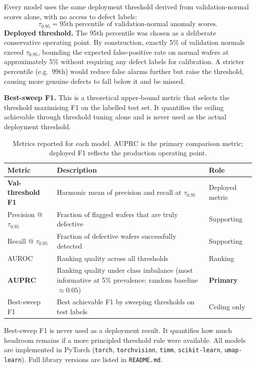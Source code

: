 \documentclass[11pt]{article}
\begin{document}
Every model uses the same deployment threshold derived from validation-normal
scores alone, with no access to defect labels:
\[
  \tau_{0.95} = \text{95th percentile of validation-normal anomaly scores.}
\]
\textbf{Deployed threshold.} The 95th percentile was chosen as a deliberate conservative operating point. By construction, exactly 5\% of validation normals exceed $\tau_{0.95}$, bounding the expected false-positive rate on normal wafers at approximately 5\% without requiring any defect labels for calibration. A stricter percentile (e.g.\ 99th) would reduce false alarms further but raise the threshold, causing more genuine defects to fall below it and be missed.

\textbf{Best-sweep F1.} This is a theoretical upper-bound metric that selects the threshold maximising F1 on the labelled test set. It quantifies the ceiling achievable through threshold tuning alone and is never used as the actual deployment threshold.

\begin{table}[H]
\centering
\caption{Metrics reported for each model. AUPRC is the primary comparison metric; deployed F1 reflects the production operating point.}
\label{tab:metrics}
\begin{tabularx}{\linewidth}{>{\raggedright\arraybackslash}p{3.2cm}
                              >{\raggedright\arraybackslash}X
                              >{\raggedright\arraybackslash}p{2cm}}
\toprule
Metric & Description & Role \\
\midrule
\textbf{Val-threshold F1} & Harmonic mean of precision and recall at $\tau_{0.95}$ & Deployed metric \\
Precision @ $\tau_{0.95}$ & Fraction of flagged wafers that are truly defective & Supporting \\
Recall @ $\tau_{0.95}$ & Fraction of defective wafers successfully detected & Supporting \\
AUROC & Ranking quality across all thresholds & Ranking \\
\textbf{AUPRC} & Ranking quality under class imbalance (most informative at 5\% prevalence; random baseline $\approx 0.05$) & \textbf{Primary} \\
Best-sweep F1 & Best achievable F1 by sweeping thresholds on test labels & Ceiling only \\
\bottomrule
\end{tabularx}
\end{table}

Best-sweep F1 is never used as a deployment result. It quantifies how much
headroom remains if a more principled threshold rule were available. All models
are implemented in PyTorch (\texttt{torch}, \texttt{torchvision}, \texttt{timm},
\texttt{scikit-learn}, \texttt{umap-learn}). Full library versions are listed in \texttt{README.md}.
\end{document}
